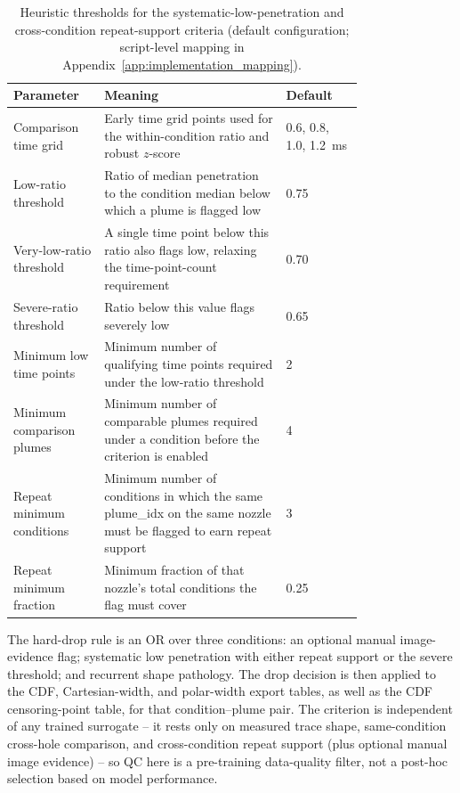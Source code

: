 \begin{table}[H]
\centering
\footnotesize
\setlength{\tabcolsep}{4pt}
\begin{tabularx}{\linewidth}{@{}L{0.26\linewidth}L{0.52\linewidth}Y@{}}
\toprule
Parameter & Meaning & Default \\
\midrule
Comparison time grid & Early time grid points used for the within-condition ratio and robust $z$-score & \SI{0.6}{}, \SI{0.8}{}, \SI{1.0}{}, \SI{1.2}{ms} \\
Low-ratio threshold & Ratio of median penetration to the condition median below which a plume is flagged low & 0.75 \\
Very-low-ratio threshold & A single time point below this ratio also flags low, relaxing the time-point-count requirement & 0.70 \\
Severe-ratio threshold & Ratio below this value flags severely low & 0.65 \\
Minimum low time points & Minimum number of qualifying time points required under the low-ratio threshold & 2 \\
Minimum comparison plumes & Minimum number of comparable plumes required under a condition before the criterion is enabled & 4 \\
Repeat minimum conditions & Minimum number of conditions in which the same plume\_idx on the same nozzle must be flagged to earn repeat support & 3 \\
Repeat minimum fraction & Minimum fraction of that nozzle's total conditions the flag must cover & 0.25 \\
\bottomrule
\end{tabularx}
\caption{Heuristic thresholds for the systematic-low-penetration and cross-condition repeat-support criteria (default configuration; script-level mapping in Appendix~\ref{app:implementation_mapping}).}
\label{tab:qc-lowpen-thresholds-rewrite}
\end{table}

The hard-drop rule is an OR over three conditions: an optional manual
image-evidence flag; systematic low penetration with either repeat support
or the severe threshold; and recurrent shape pathology. The drop decision is
then applied to the CDF, Cartesian-width, and polar-width export tables, as
well as the CDF censoring-point table, for that condition--plume pair. The
criterion is independent of any trained surrogate -- it rests only on
measured trace shape, same-condition cross-hole comparison, and
cross-condition repeat support (plus optional manual image evidence) --
so QC here is a pre-training data-quality filter, not a post-hoc selection
based on model performance.

